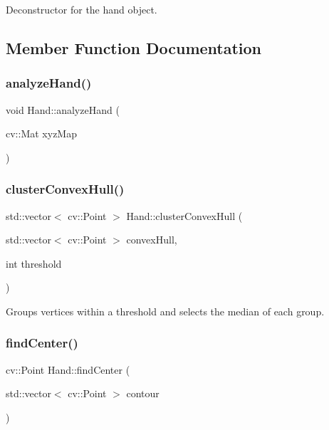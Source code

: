 Deconstructor for the hand object. 



\subsection{Member Function Documentation}
\hypertarget{class_hand_a0a58ac8e96eab17c99f820f0a4075275}{}\label{class_hand_a0a58ac8e96eab17c99f820f0a4075275} 
\subsubsection{\texorpdfstring{analyze\+Hand()}{analyzeHand()}}
{\footnotesize\ttfamily void Hand\+::analyze\+Hand (\begin{DoxyParamCaption}\item[{cv\+::\+Mat}]{xyz\+Map }\end{DoxyParamCaption})\hspace{0.3cm}{\ttfamily [private]}}

\hypertarget{class_hand_ad7b1c8745ec41d551945e75e75961f85}{}\label{class_hand_ad7b1c8745ec41d551945e75e75961f85} 
\subsubsection{\texorpdfstring{cluster\+Convex\+Hull()}{clusterConvexHull()}}
{\footnotesize\ttfamily std\+::vector$<$ cv\+::\+Point $>$ Hand\+::cluster\+Convex\+Hull (\begin{DoxyParamCaption}\item[{std\+::vector$<$ cv\+::\+Point $>$}]{convex\+Hull,  }\item[{int}]{threshold }\end{DoxyParamCaption})\hspace{0.3cm}{\ttfamily [private]}}



Groups vertices within a threshold and selects the median of each group. 

\hypertarget{class_hand_ab089502dd52e8251c5a9efadac2784dd}{}\label{class_hand_ab089502dd52e8251c5a9efadac2784dd} 
\subsubsection{\texorpdfstring{find\+Center()}{findCenter()}}
{\footnotesize\ttfamily cv\+::\+Point Hand\+::find\+Center (\begin{DoxyParamCaption}\item[{std\+::vector$<$ cv\+::\+Point $>$}]{contour }\end{DoxyParamCaption})\hspace{0.3cm}{\ttfamily [private]}}



